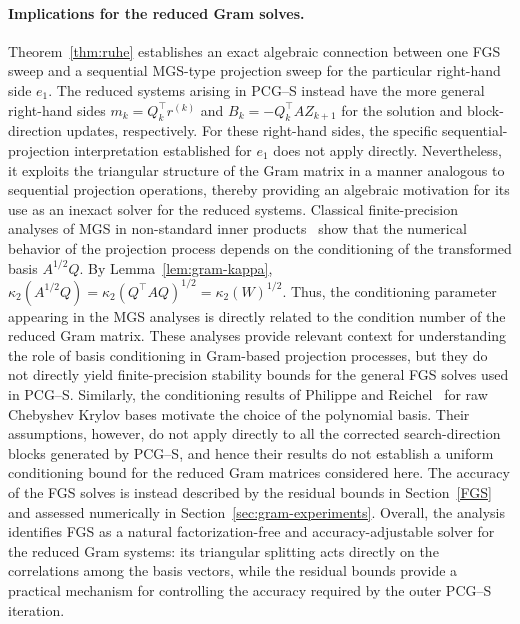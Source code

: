 \documentclass[pdflatex,sn-mathphys-num]{sn-jnl}%
\begin{document}
\paragraph{Implications for the reduced Gram solves.}
Theorem~\ref{thm:ruhe} establishes an exact algebraic connection
between one FGS sweep and a sequential MGS-type projection sweep for
the particular right-hand side $e_1$. The reduced systems arising in
PCG--S instead have the more general right-hand sides
$m_k=Q_k^\top r^{(k)}$
and $B_k=-Q_k^\top AZ_{k+1}$
for the solution and block-direction updates, respectively. For these
right-hand sides, the specific sequential-projection interpretation
established for $e_1$ does not apply directly. Nevertheless, it exploits the
triangular structure of the Gram matrix in a manner analogous to
sequential projection operations, thereby providing an algebraic
motivation for its use as an inexact solver for the reduced systems.
Classical finite-precision analyses of MGS in non-standard inner
products~\cite{thomas1991congressus,thomas1992congressus,
thomas1992conpar,rozloznik2012,lowery2014}
show that the numerical behavior of the projection process depends on
the conditioning of the transformed basis $A^{1/2}Q$. By
Lemma~\ref{lem:gram-kappa},
$\kappa_2(A^{1/2}Q)=\kappa_2(Q^\top A Q)^{1/2}=
\kappa_2(W)^{1/2}.$
Thus, the conditioning parameter appearing in the MGS analyses is
directly related to the condition number of the reduced Gram matrix.
These analyses provide relevant context for understanding the role of
basis conditioning in Gram-based projection processes, but they do
not directly yield finite-precision stability bounds for the general
FGS solves used in PCG--S.
Similarly, the conditioning results of Philippe and
Reichel~\cite{Reichel2012} for raw Chebyshev Krylov bases motivate the
choice of the polynomial basis. Their assumptions, however, do not
apply directly to all the corrected search-direction blocks generated
by PCG--S, and hence their results do not establish a uniform
conditioning bound for the reduced Gram matrices considered here.
The accuracy of the FGS solves is instead described by the residual
bounds in Section~\ref{FGS} and assessed numerically in
Section~\ref{sec:gram-experiments}. Overall, the analysis identifies
FGS as a natural factorization-free and accuracy-adjustable solver for
the reduced Gram systems: its triangular splitting acts directly on
the correlations among the basis vectors, while the residual bounds
provide a practical mechanism for controlling the accuracy required
by the outer PCG--S iteration.
\end{document}

